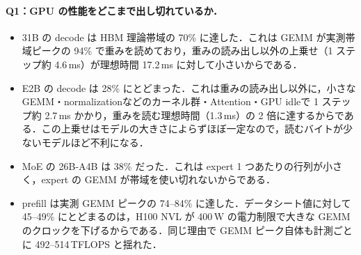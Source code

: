 \paragraph{Q1：GPU の性能をどこまで出し切れているか．}
\begin{itemize}
\item 31B の decode は HBM 理論帯域の 70\% に達した．これは GEMM が実測帯域ピークの 94\% で重みを読めており，重みの読み出し以外の上乗せ（1 ステップ約 4.6\,ms）が理想時間 17.2\,ms に対して小さいからである．
\item E2B の decode は 28\% にとどまった．これは重みの読み出し以外に，小さな GEMM・normalizationなどのカーネル群・Attention・GPU idleで 1 ステップ約 2.7\,ms かかり，重みを読む理想時間（1.3\,ms）の 2 倍に達するからである．この上乗せはモデルの大きさによらずほぼ一定なので，読むバイトが少ないモデルほど不利になる．
\item MoE の 26B-A4B は 38\% だった．これは expert 1 つあたりの行列が小さく，expert の GEMM が帯域を使い切れないからである．
\item prefill は実測 GEMM ピークの 74--84\% に達した．データシート値に対して 45--49\% にとどまるのは，H100 NVL が 400\,W の電力制限で大きな GEMM のクロックを下げるからである．同じ理由で GEMM ピーク自体も計測ごとに 492--514\,TFLOPS と揺れた．
\end{itemize}

